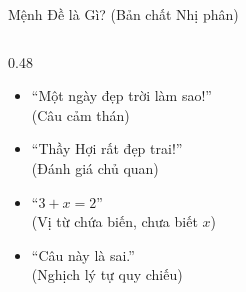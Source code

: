 \documentclass[aspectratio=169, 10pt]{beamer}
\begin{document}
\begin{frame}{Mệnh Đề là Gì? (Bản chất Nhị phân)}
\begin{columns}[t, onlytextwidth]
\begin{column}{0.48\textwidth}
\begin{cozyTrap}
\begin{itemize}
          \item ``Một ngày đẹp trời làm sao!''\\
          \textcolor{cozySlate!80!black}{(Câu cảm thán)}
          \item ``Thầy Hợi rất đẹp trai!''\\
          \textcolor{cozySlate!80!black}{(Đánh giá chủ quan)}
          \item ``$3 + x = 2$''\\
          \textcolor{cozySlate!80!black}{(Vị từ chứa biến, chưa biết $x$)}
          \item ``Câu này là sai.''\\
          \textcolor{cozySlate!80!black}{(Nghịch lý tự quy chiếu)}
        \end{itemize}
      \end{cozyTrap}
    \end{column}
  \end{columns}
\end{frame}
\end{document}
